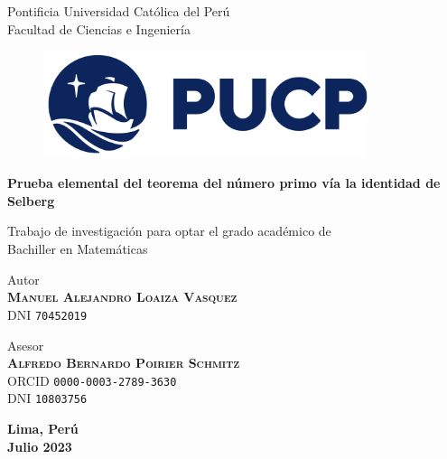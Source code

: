 \thispagestyle{empty}

\bigskip

\begin{center}
  {\baselineskip=30pt \Large Pontificia Universidad Cat\'olica del Per\'u} \\
  {\baselineskip=30pt \large Facultad de Ciencias e Ingenier\'ia}
\end{center}

\bigskip

\begin{figure}[H]
  \begin{center}
    \includegraphics[width=9.5cm]{images/2021-pucp-logo.png}
  \end{center}
\end{figure}

\begin{center}
  \begin{minipage}{14.0cm}
    \begin{center}
      \textcolor{pucp}
      {\textbf{\huge Prueba elemental del teorema del n\'umero primo v\'ia la identidad de Selberg}}
    \end{center}
  \end{minipage}
\end{center}

\vspace*{2.00cm}

\begin{center}
  Trabajo de investigaci\'on para optar el grado acad\'emico de \\
  Bachiller en Matem\'aticas
\end{center}

\vspace*{2.00cm}

\begin{center}
  Autor \\
  \textbf{\textsc{Manuel Alejandro Loaiza Vasquez}} \\
  DNI \texttt{70452019}
\end{center}

\vspace*{0.5cm}

\begin{center}
  Asesor \\
  \textbf{\textsc{Alfredo Bernardo Poirier Schmitz}} \\
  ORCID \texttt{0000-0003-2789-3630} \\
  DNI \texttt{10803756}
\end{center}

\vspace*{1.00cm}

\begin{center}
  {
    \baselineskip=10pt
    \textbf{Lima, Per\'u} \\
    \textbf{Julio 2023}
  }
\end{center}
